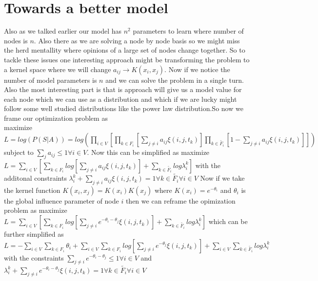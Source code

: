 \section*{Towards a better model}
Also as we talked earlier our model has $n^2$ parameters to learn where number of nodes is $n$. Also there as we are solving a node by node basis so we might miss the herd mentallity where opinions of a large set of nodes change together. So to tackle these issues one interesting approach might be transforming the problem to a kernel space where we will change $a_{ij} \rightarrow K(x_i,x_j)$. Now if we notice the number of model parameters is $n$ and we can solve the problem in a single turn. Also the most interesting part is that is approach will give us a model value for each node which we can use as a distribution and which if we are lucky might follow some well studied distributions like the power law distribution.So now we frame our optimization problem as \\
maximize $L = log(P(S|A)) = log(\displaystyle\prod_{i \in V}[\displaystyle\prod_{k \in F_i}[\displaystyle\sum_{j \neq i} a_{ij}\xi (i,j,t_k)]\displaystyle\prod_{k \in \widetilde{F_{i}}} [1-\displaystyle\sum_{j \neq i}a_{ij}\xi (i,j,t_k)]])$ subject to $\displaystyle\sum_{j} a_{ij} \leq 1 \forall i \in V$. 
Now this can be simplified as maximize $L = \displaystyle\sum_{i \in V}[\displaystyle\sum_{k \in F_i}log[\displaystyle\sum_{j \neq i} a_{ij}\xi (i,j,t_k)]+\displaystyle\sum_{k \in \widetilde{F_{i}}}log\lambda_{i}^{k}]$ with the additonal constraints $\lambda_{i}^{k} + \displaystyle\sum_{j \neq i}a_{ij}\xi (i,j,t_k) = 1 \forall k \in \widetilde{F_{i}} \forall i \in V$
Now if we take the kernel function $K(x_i,x_j) = K(x_i)K(x_j)$ where $K(x_i) = e^{-\theta_i}$ and $\theta_i$ is the global influence parameter of node $i$ then we can reframe the opimization problem as maximize $L = \displaystyle\sum_{i \in V}[\displaystyle\sum_{k \in F_i}log[\displaystyle\sum_{j \neq i} e^{-\theta_i-\theta_j}\xi (i,j,t_k)]+\displaystyle\sum_{k \in \widetilde{F_{i}}}log\lambda_{i}^{k}]$ which can be further simplified as $L = -\displaystyle\sum_{i \in V}\displaystyle\sum_{k \in F_i}\theta_i+\displaystyle\sum_{i \in V}\displaystyle\sum_{k \in F_i}log[\displaystyle\sum_{j \neq i} e^{-\theta_j}\xi (i,j,t_k)]+\displaystyle\sum_{i \in V}\displaystyle\sum_{k \in \widetilde{F_{i}}}log\lambda_{i}^{k}$ with the constraints $\displaystyle\sum_{j \neq i}e^{-\theta_i-\theta_j} \leq 1 \forall i \in V$ and $\lambda_{i}^{k} + \displaystyle\sum_{j \neq i}e^{-\theta_i-\theta_j}\xi(i,j,t_k) = 1 \forall k \in \widetilde{F_i} \forall i\in V$
